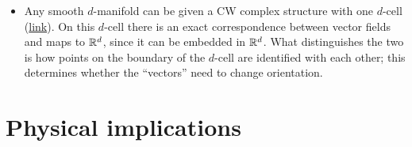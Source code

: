 {\begin{itemize}
	\item Any smooth $d$-manifold can be given a CW complex structure with one $d$-cell (\href{https://mathoverflow.net/questions/120799/manifolds-admitting-cw-structure-with-single-n-cell}{link}). On this $d$-cell there is an exact correspondence between vector fields and maps to $\mathbb{R}^d$, since it can be embedded in $\mathbb{R}^d$. What distinguishes the two is how points on the boundary of the $d$-cell are identified with each other; this determines whether the ``vectors'' need to change orientation.
\end{itemize}
}  %

\section{Physical implications}